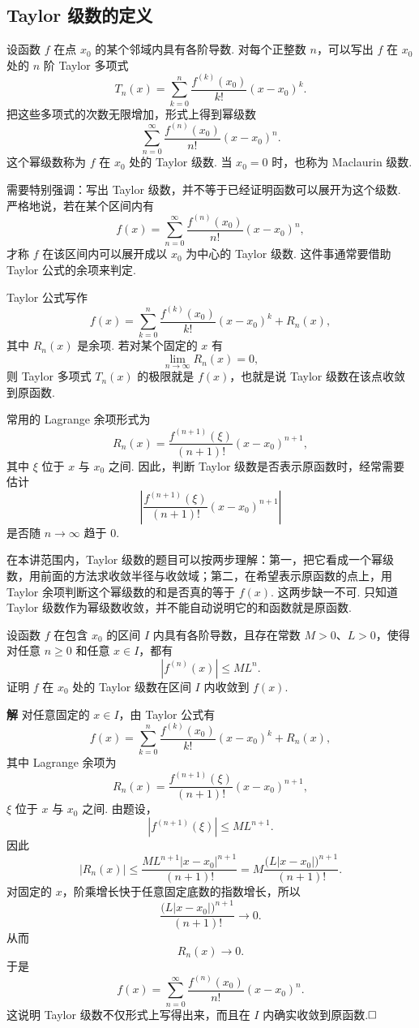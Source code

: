 \documentclass{ctexart}
\newenvironment{custom}[1]{\par\noindent \textbf{#1}\quad}{\par\vspace{1em}}
\begin{document}
\subsection{Taylor 级数的定义}

设函数 $f$ 在点 $x_0$ 的某个邻域内具有各阶导数. 对每个正整数 $n$，可以写出 $f$ 在 $x_0$ 处的 $n$ 阶 Taylor 多项式
\[
T_n(x)=\sum_{k=0}^{n}\frac{f^{(k)}(x_0)}{k!}(x-x_0)^k.
\]
把这些多项式的次数无限增加，形式上得到幂级数
\[
\sum_{n=0}^{\infty}\frac{f^{(n)}(x_0)}{n!}(x-x_0)^n.
\]
这个幂级数称为 $f$ 在 $x_0$ 处的 Taylor 级数. 当 $x_0=0$ 时，也称为 Maclaurin 级数.

需要特别强调：写出 Taylor 级数，并不等于已经证明函数可以展开为这个级数. 严格地说，若在某个区间内有
\[
f(x)=\sum_{n=0}^{\infty}\frac{f^{(n)}(x_0)}{n!}(x-x_0)^n,
\]
才称 $f$ 在该区间内可以展开成以 $x_0$ 为中心的 Taylor 级数. 这件事通常要借助 Taylor 公式的余项来判定.

Taylor 公式写作
\[
f(x)=\sum_{k=0}^{n}\frac{f^{(k)}(x_0)}{k!}(x-x_0)^k+R_n(x),
\]
其中 $R_n(x)$ 是余项. 若对某个固定的 $x$ 有
\[
\lim_{n\to\infty}R_n(x)=0,
\]
则 Taylor 多项式 $T_n(x)$ 的极限就是 $f(x)$，也就是说 Taylor 级数在该点收敛到原函数.

常用的 Lagrange 余项形式为
\[
R_n(x)=\frac{f^{(n+1)}(\xi)}{(n+1)!}(x-x_0)^{n+1},
\]
其中 $\xi$ 位于 $x$ 与 $x_0$ 之间. 因此，判断 Taylor 级数是否表示原函数时，经常需要估计
\[
\left|\frac{f^{(n+1)}(\xi)}{(n+1)!}(x-x_0)^{n+1}\right|
\]
是否随 $n\to\infty$ 趋于 $0$.

在本讲范围内，Taylor 级数的题目可以按两步理解：第一，把它看成一个幂级数，用前面的方法求收敛半径与收敛域；第二，在希望表示原函数的点上，用 Taylor 余项判断这个幂级数的和是否真的等于 $f(x)$. 这两步缺一不可. 只知道 Taylor 级数作为幂级数收敛，并不能自动说明它的和函数就是原函数.

\begin{example}
设函数 $f$ 在包含 $x_0$ 的区间 $I$ 内具有各阶导数，且存在常数 $M>0$、$L>0$，使得对任意 $n\geqslant0$ 和任意 $x\in I$，都有
\[
|f^{(n)}(x)|\leqslant ML^n.
\]
证明 $f$ 在 $x_0$ 处的 Taylor 级数在区间 $I$ 内收敛到 $f(x)$.
\end{example}

\begin{custom}{解}
对任意固定的 $x\in I$，由 Taylor 公式有
\[
f(x)=\sum_{k=0}^{n}\frac{f^{(k)}(x_0)}{k!}(x-x_0)^k+R_n(x),
\]
其中 Lagrange 余项为
\[
R_n(x)=\frac{f^{(n+1)}(\xi)}{(n+1)!}(x-x_0)^{n+1},
\]
$\xi$ 位于 $x$ 与 $x_0$ 之间. 由题设，
\[
|f^{(n+1)}(\xi)|\leqslant ML^{n+1}.
\]
因此
\[
|R_n(x)|
\leqslant
\frac{M L^{n+1}|x-x_0|^{n+1}}{(n+1)!}
=
M\frac{\bigl(L|x-x_0|\bigr)^{n+1}}{(n+1)!}.
\]
对固定的 $x$，阶乘增长快于任意固定底数的指数增长，所以
\[
\frac{\bigl(L|x-x_0|\bigr)^{n+1}}{(n+1)!}\to0.
\]
从而
\[
R_n(x)\to0.
\]
于是
\[
f(x)=\sum_{n=0}^{\infty}\frac{f^{(n)}(x_0)}{n!}(x-x_0)^n.
\]
这说明 Taylor 级数不仅形式上写得出来，而且在 $I$ 内确实收敛到原函数.$\hfill{\square}$
\end{custom}
\end{document}
